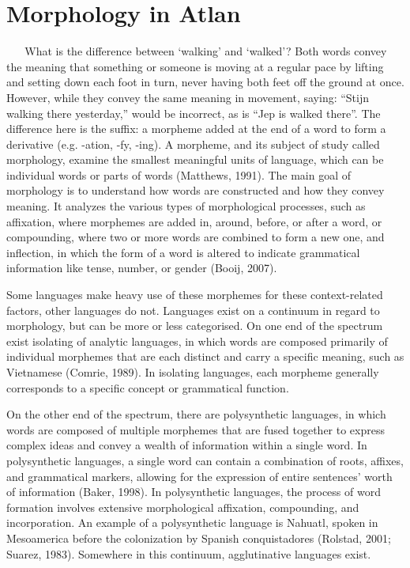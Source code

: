 \section{Morphology in Atlan} 
  
\noindent What is the difference between ‘walking’ and ‘walked’? Both words convey the meaning that something or someone is moving at a regular pace by lifting and setting down each foot in turn, never having both feet off the ground at once. However, while they convey the same meaning in movement, saying: “Stijn walking there yesterday,” would be incorrect, as is “Jep is walked there”. The difference here is the suffix: a morpheme added at the end of a word to form a derivative (e.g. -ation, -fy, -ing). A morpheme, and its subject of study called morphology, examine the smallest meaningful units of language, which can be individual words or parts of words (Matthews, 1991). The main goal of morphology is to understand how words are constructed and how they convey meaning. It analyzes the various types of morphological processes, such as affixation, where morphemes are added in, around, before, or after a word, or compounding, where two or more words are combined to form a new one, and inflection, in which the form of a word is altered to indicate grammatical information like tense, number, or gender (Booij, 2007). 

Some languages make heavy use of these morphemes for these context-related factors, other languages do not. Languages exist on a continuum in regard to morphology, but can be more or less categorised. On one end of the spectrum exist isolating of analytic languages, in which words are composed primarily of individual morphemes that are each distinct and carry a specific meaning, such as Vietnamese (Comrie, 1989). In isolating languages, each morpheme generally corresponds to a specific concept or grammatical function. 

On the other end of the spectrum, there are polysynthetic languages, in which words are composed of multiple morphemes that are fused together to express complex ideas and convey a wealth of information within a single word. In polysynthetic languages, a single word can contain a combination of roots, affixes, and grammatical markers, allowing for the expression of entire sentences' worth of information (Baker, 1998). In polysynthetic languages, the process of word formation involves extensive morphological affixation, compounding, and incorporation. An example of a polysynthetic language is Nahuatl, spoken in Mesoamerica before the colonization by Spanish conquistadores (Rolstad, 2001; Suarez, 1983). Somewhere in this continuum, agglutinative languages exist. 

